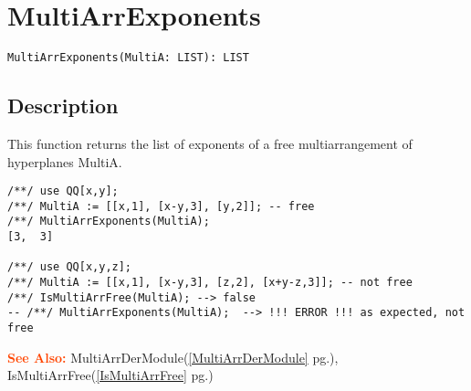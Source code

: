 \documentclass[a4paper]{mybook}
\newenvironment{command}{}{} %
\newcommand\SeeAlso{\par\textcolor{OrangeRed}{\textbf{\large See Also: }}}
\begin{document}
\section{MultiArrExponents}
\label{MultiArrExponents}
\begin{command} %


\begin{Verbatim}[label=syntax, rulecolor=\color{MidnightBlue},
frame=single]
MultiArrExponents(MultiA: LIST): LIST 
\end{Verbatim}


\subsection*{Description}

This function returns the list of exponents of a free multiarrangement of hyperplanes MultiA.
\begin{Verbatim}[label=example, rulecolor=\color{PineGreen}, frame=single]
/**/ use QQ[x,y];	
/**/ MultiA := [[x,1], [x-y,3], [y,2]]; -- free
/**/ MultiArrExponents(MultiA);
[3,  3]

/**/ use QQ[x,y,z];
/**/ MultiA := [[x,1], [x-y,3], [z,2], [x+y-z,3]]; -- not free
/**/ IsMultiArrFree(MultiA); --> false
-- /**/ MultiArrExponents(MultiA);  --> !!! ERROR !!! as expected, not free
\end{Verbatim}


\SeeAlso %
  MultiArrDerModule(\ref{MultiArrDerModule} pg.\pageref{MultiArrDerModule}), 
    IsMultiArrFree(\ref{IsMultiArrFree} pg.\pageref{IsMultiArrFree})
\end{command} %
\end{document}
